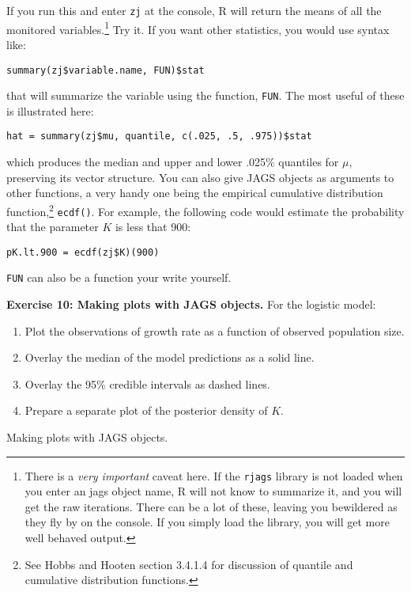 \documentclass[12pt,english]{article}
\begin{document}
{\noindent If you run this and enter \texttt{zj} at the console, R will return the means of all the monitored variables.\footnote{There is a \emph{very important} caveat here. If the \texttt{rjags} library is not loaded when you enter an jags object name, R will not know to summarize it, and you will get the raw iterations. There can be a lot of these, leaving you bewildered as they fly by on the console. If you simply load the library, you will get more well behaved output.} Try it. If you want other statistics, you would use syntax like:

\begin{Verbatim}
summary(zj$variable.name, FUN)$stat
\end{Verbatim}

\noindent that will summarize the variable using the function, \texttt{FUN}. The most useful of these is illustrated here:

\begin{Verbatim}
hat = summary(zj$mu, quantile, c(.025, .5, .975))$stat
\end{Verbatim}

\noindent which produces the median and upper and lower .025\% quantiles for $\mu$, preserving its vector structure. You can also give JAGS objects as arguments to other functions, a very handy one being the empirical cumulative distribution function,\footnote{See Hobbs and Hooten \citeyearpar{hobbs2015bayesian} section 3.4.1.4 for discussion of quantile and cumulative distribution functions.} \texttt{ecdf()}. For example, the following code would estimate the probability that the parameter $K$ is less that 900:

\begin{Verbatim}
pK.lt.900 = ecdf(zj$K)(900)
\end{Verbatim}

\noindent \texttt{FUN} can also be a function your write yourself.

\bigskip
\belowcaptionskip=-40pt
\begin{exercise}
\begin{mdframed}
\doublespacing
\textbf{Exercise 10: Making plots with JAGS objects.} For the logistic model:
\begin{enumerate}
\item Plot the observations of growth rate as a function of observed population size.
\item Overlay the median of the model predictions as a solid line.
\item Overlay the 95\% credible intervals as dashed lines.
\item Prepare a separate plot of the posterior density of $K$.
\end{enumerate}
\end{mdframed}
\captionsetup{textformat=empty, labelformat=empty}
\caption[ Making plots with JAGS objects]{Making plots with JAGS objects.}
\label{ex:plotting jags object}
\end{exercise}
\belowcaptionskip=0pt

}
\end{document}

